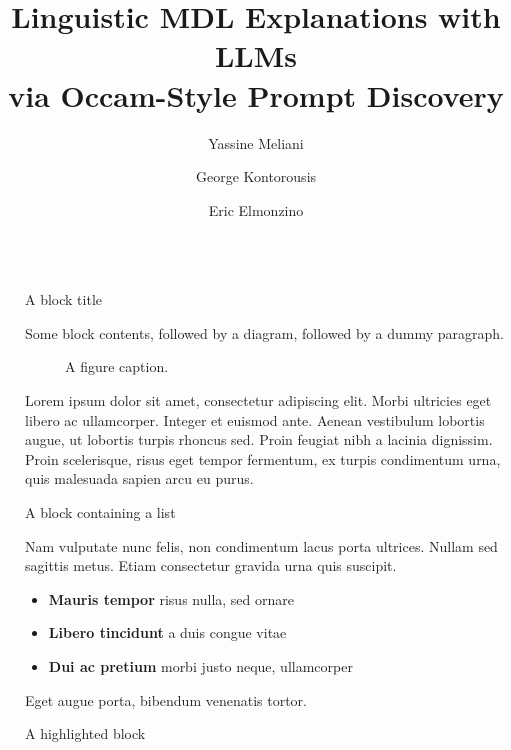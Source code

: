 \documentclass[final]{beamer}
\title{Linguistic MDL Explanations with LLMs \\ \large via Occam-Style Prompt Discovery}
\author{Yassine Meliani \inst{1} \and George Kontorousis \inst{1} \and Eric Elmonzino \inst{2}}
\institute[shortinst]{\inst{1} McGill University \samelineand \inst{2} MILA}
\newlength{\sepwidth}
\newlength{\colwidth}
\newcommand{\separatorcolumn}{\begin{column}{\sepwidth}\end{column}}
\begin{document}
\begin{frame}[t]
\begin{columns}[t]
\separatorcolumn

\begin{column}{\colwidth}

  \begin{block}{A block title}

    Some block contents, followed by a diagram, followed by a dummy paragraph.

    \begin{figure}
      \centering
      \caption{A figure caption.}
    \end{figure}

    Lorem ipsum dolor sit amet, consectetur adipiscing elit. Morbi ultricies
    eget libero ac ullamcorper. Integer et euismod ante. Aenean vestibulum
    lobortis augue, ut lobortis turpis rhoncus sed. Proin feugiat nibh a
    lacinia dignissim. Proin scelerisque, risus eget tempor fermentum, ex
    turpis condimentum urna, quis malesuada sapien arcu eu purus.

  \end{block}

  \begin{block}{A block containing a list}

    Nam vulputate nunc felis, non condimentum lacus porta ultrices. Nullam sed
    sagittis metus. Etiam consectetur gravida urna quis suscipit.

    \begin{itemize}
      \item \textbf{Mauris tempor} risus nulla, sed ornare
      \item \textbf{Libero tincidunt} a duis congue vitae
      \item \textbf{Dui ac pretium} morbi justo neque, ullamcorper
    \end{itemize}

    Eget augue porta, bibendum venenatis tortor.

  \end{block}

  \begin{alertblock}{A highlighted block}


\end{alertblock}
\end{column}
\end{columns}
\end{frame}
\end{document}
